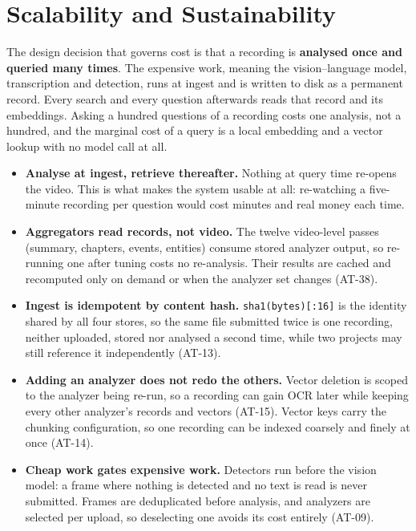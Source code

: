 \documentclass[11pt,a4paper]{article}
\begin{document}
\section{Scalability and Sustainability}

The design decision that governs cost is that a recording is \textbf{analysed once and
queried many times}. The expensive work, meaning the vision--language model, transcription
and detection, runs at ingest and is written to disk as a permanent record. Every search and
every question afterwards reads that record and its embeddings. Asking a hundred questions
of a recording costs one analysis, not a hundred, and the marginal cost of a query is a
local embedding and a vector lookup with no model call at all.

\begin{itemize}
  \item \textbf{Analyse at ingest, retrieve thereafter.} Nothing at query time re-opens
        the video. This is what makes the system usable at all: re-watching a five-minute
        recording per question would cost minutes and real money each time.

  \item \textbf{Aggregators read records, not video.} The twelve video-level passes
        (summary, chapters, events, entities) consume stored analyzer output, so
        re-running one after tuning costs no re-analysis. Their results are cached and
        recomputed only on demand or when the analyzer set changes (AT-38).

  \item \textbf{Ingest is idempotent by content hash.} \texttt{sha1(bytes)[:16]} is the
        identity shared by all four stores, so the same file submitted twice is one
        recording, neither uploaded, stored nor analysed a second time, while two
        projects may still reference it independently (AT-13).

  \item \textbf{Adding an analyzer does not redo the others.} Vector deletion is scoped to
        the analyzer being re-run, so a recording can gain OCR later while keeping every
        other analyzer's records and vectors (AT-15). Vector keys carry the chunking
        configuration, so one recording can be indexed coarsely and finely at once (AT-14).

  \item \textbf{Cheap work gates expensive work.} Detectors run before the vision model: a
        frame where nothing is detected and no text is read is never submitted. Frames are
        deduplicated before analysis, and analyzers are selected per upload, so deselecting
        one avoids its cost entirely (AT-09).


\end{itemize}
\end{document}
